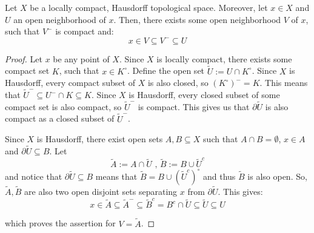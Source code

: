 \begin{lemma}\label{lem:smaller_compact_nbh} Let $X$ be a locally compact, Hausdorff topological space. Moreover, let $x\in X$ and $U$ an open neighborhood of $x$. Then, there exists some open neighborhood $V$ of $x$, such that $V^-$ is compact and:
\[x\in V\subseteq V^-\subseteq U\]
\end{lemma}
\begin{proof} Let $x$ be any point of $X$. Since $X$ is locally compact, there exists some compact set $K$, such that $x\in K^{\circ}$. Define the open set $\tilde{U}:=U\cap K^{\circ}$. Since $X$ is Hausdorff, every compact subset of $X$ is also closed, so $(K^{\circ})^-=K$. This means that $\tilde{U}^-\subseteq U^-\cap K\subseteq K$. Since $X$ is Hausdorff, every closed subset of some compact set is also compact, so $\tilde{U}^-$ is compact. This gives us that $\partial\tilde{U}$ is also compact as a closed subset of $\tilde{U}^-$.

\begin{minipage}{.5\linewidth}
Since $X$ is Hausdorff, there exist open sets $A,B\subseteq X$ such that $A\cap B=\emptyset$, $x\in A$ and $\partial\tilde{U}\subseteq B$. Let
\[\tilde{A}:=A\cap\tilde{U}\text{ , }\tilde{B}:=B\cup\tilde{U}^c\]
and notice that $\partial\tilde{U}\subseteq B$ means that $\tilde{B}=B\cup(\tilde{U}^c)^{\circ}$ and thus $\tilde{B}$ is also open. So, $\tilde{A},\tilde{B}$ are also two open disjoint sets separating $x$ from $\partial\tilde{U}$. This gives:
\[x\in\tilde{A}\subseteq\tilde{A}^-\subseteq\tilde{B}^c=B^c\cap\tilde{U}\subseteq\tilde{U}\subseteq U\]
\end{minipage}%
\begin{minipage}{.5\linewidth}
\begin{center}
\end{center}
\end{minipage}

which proves the assertion for $V=\tilde{A}$.
\end{proof}

